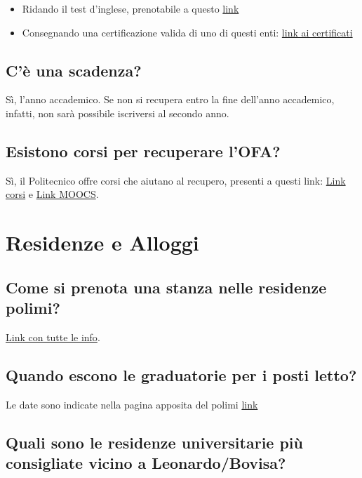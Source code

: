 \documentclass[legal]{polinetwork}
\begin{document}
\begin{itemize}
  \item Ridando il test d'inglese, prenotabile a questo \href{https://www.polimi.it/studenti/requisiti-linguistici/enti-esterni}{link}
  \item Consegnando una certificazione valida di uno di questi enti: \href{https://www.polimi.it/studenti/requisiti-linguistici/studenti-dei-corsi-di-laurea-triennale-in-italiano}{link ai certificati}
\end{itemize}


\subsection{C'è una scadenza?}


Sì, l'anno accademico. Se non si recupera entro la fine dell'anno accademico, infatti, non sarà possibile iscriversi al secondo anno.

\subsection{Esistono corsi per recuperare l'OFA?}


Sì, il Politecnico offre corsi che aiutano al recupero, presenti a questi link: \href{https://www.polimi.it/formazione/corsi-di-lingua}{Link corsi} e \href{https://www.polimi.it/formazione/moocs-polimi-open-knowledge}{Link MOOCS}.

\section{Residenze e Alloggi}


\subsection{Come si prenota una stanza nelle residenze polimi?}


\href{https://www.residenze.polimi.it/tariffe/}{Link con tutte le info}.

\subsection{Quando escono le graduatorie per i posti letto?}


Le date sono indicate nella pagina apposita del polimi \href{https://www.residenze.polimi.it/}{link}

\subsection{Quali sono le residenze universitarie più consigliate vicino a Leonardo/Bovisa?}
\end{document}
